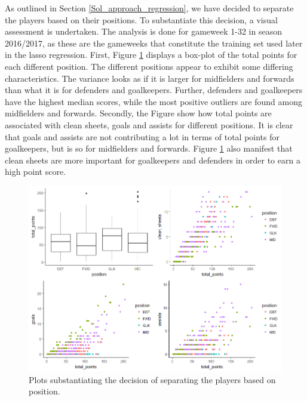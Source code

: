 As outlined in Section \ref{Sol_approach_regression}, we have decided to separate the players based on their positions. To substantiate this decision, a visual assessment is undertaken. The analysis is done for gameweek 1-32 in season 2016/2017, as these are the gameweeks that constitute the training set used later in the lasso regression. First, Figure \ref{fig:cluster_plots} displays a box-plot of the total points for each different position. The different positions appear to exhibit some differing characteristics. The variance looks as if it is larger for midfielders and forwards than what it is for defenders and goalkeepers. Further, defenders and goalkeepers have the highest median scores, while the most positive outliers are found among midfielders and forwards. Secondly, the Figure show how total points are associated with clean sheets, goals and assists for different positions. It is clear that goals and assists are not contributing a lot in terms of total points for goalkeepers, but is so for midfielders and forwards. Figure \ref{fig:cluster_plots} also manifest that clean sheets are more important for goalkeepers and defenders in order to earn a high point score.

\begin{figure}[H]
    \centering
    \includegraphics[scale=0.55]{fig/chapter_6/cluster_plots.png}
    \caption{Plots substantiating the decision of separating the players based on position.}
\label{fig:cluster_plots}    
\end{figure}








